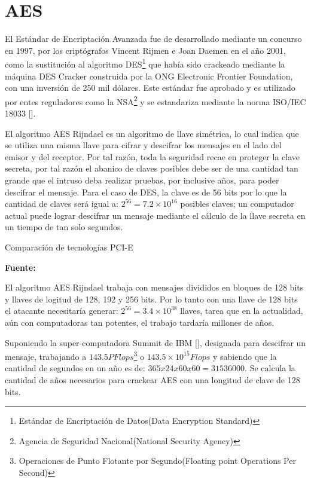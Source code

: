 \documentclass[../main/main.tex]{subfiles}
\begin{document}
  \section{AES}

  El Estándar de Encriptación Avanzada fue de desarrollado mediante un concurso en 1997, por los criptógrafos Vincent Rijmen e Joan Daemen en el año 2001, como la sustitución al algoritmo DES\footnote{Estándar de Encriptación de Datos(Data Encryption Standard)} que había sido crackeado mediante la máquina DES Cracker construida por la ONG Electronic Frontier Foundation, con una inversión de 250 mil dólares. Este estándar fue aprobado y es utilizado por entes reguladores como la NSA\footnote{Agencia de Seguridad Nacional(National Security Agency)} y se estandariza mediante la norma ISO/IEC 18033 [\cite{standard:iso_18033}].

  El algoritmo AES Rijndael es un algoritmo de llave simétrica, lo cual indica que se utiliza una misma llave para cifrar y descifrar los mensajes en el lado del emisor y del receptor. Por tal razón, toda la seguridad recae en proteger la clave secreta, por tal razón el abanico de claves posibles debe ser de una cantidad tan grande que el intruso deba realizar pruebas, por inclusive años, para poder descifrar el mensaje. Para el caso de DES, la clave es de 56 bits por lo que la cantidad de claves será igual a: $2^{56} = 7.2 \times 10^{16}$ posibles claves; un computador actual puede lograr descifrar un mensaje mediante el cálculo de la llave secreta en un tiempo de tan solo segundos.

  \begin{table}[H]
    \centering
    \caption{Comparación de tecnologías PCI-E}
    
    \caption*{\textbf{Fuente:} \cite{web:tiempo_crack_aes}}
  \end{table}

  El algoritmo AES Rijndael trabaja con mensajes divididos en bloques de 128 bits y llaves de logitud de 128, 192 y 256 bits. Por lo tanto con una llave de 128 bits el atacante necesitaría generar: $2^{56} = 3.4 \times 10^{38}$ llaves, tarea que en la actualidad, aún con computadoras tan potentes, el trabajo tardaría millones de años.

  Suponiendo la super-computadora Summit de IBM [\cite{web:supercomputadora_summit_ibm}], designada para descifrar un mensaje, trabajando a $143.5PFlops$\footnote{Operaciones de Punto Flotante por Segundo(Floating point Operations Per Second)} o $143.5 \times 10^{15} Flops$ y sabiendo que la cantidad de segundos en un año es de: $365 x 24 x 60 x 60 = 31536000$. Se calcula la cantidad de años necesarios para crackear AES con una longitud de clave de 128 bits.
\end{document}
